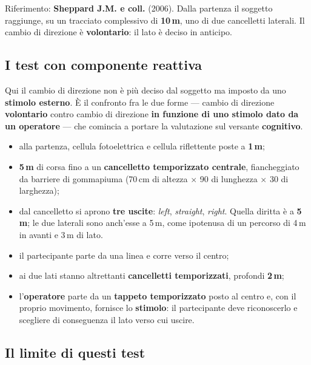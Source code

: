 Riferimento: \textbf{Sheppard J.M. e coll.} (2006). Dalla partenza il soggetto raggiunge, su un
tracciato complessivo di \textbf{10\,m}, uno di due cancelletti laterali. Il cambio di direzione è
\textbf{volontario}: il lato è deciso in anticipo.

\subsection{I test con componente reattiva}

Qui il cambio di direzione non è più deciso dal soggetto ma imposto da uno \textbf{stimolo
esterno}. È il confronto fra le due forme --- cambio di direzione \textbf{volontario} contro cambio
di direzione \textbf{in funzione di uno stimolo dato da un operatore} --- che comincia a portare la
valutazione sul versante \textbf{cognitivo}.

\begin{itemize}
  \item alla partenza, cellula fotoelettrica e cellula riflettente poste a \textbf{1\,m};
  \item \textbf{5\,m} di corsa fino a un \textbf{cancelletto temporizzato centrale}, fiancheggiato
    da barriere di gommapiuma (70\,cm di altezza $\times$ 90 di lunghezza $\times$ 30 di
    larghezza);
  \item dal cancelletto si aprono \textbf{tre uscite}: \textit{left}, \textit{straight},
    \textit{right}. Quella diritta è a \textbf{5\,m}; le due laterali sono anch'esse a 5\,m, come
    ipotenusa di un percorso di 4\,m in avanti e 3\,m di lato.
\end{itemize}

\begin{itemize}
  \item il partecipante parte da una linea e corre verso il centro;
  \item ai due lati stanno altrettanti \textbf{cancelletti temporizzati}, profondi \textbf{2\,m};
  \item l'\textbf{operatore} parte da un \textbf{tappeto temporizzato} posto al centro e, con il
    proprio movimento, fornisce lo \textbf{stimolo}: il partecipante deve riconoscerlo e scegliere
    di conseguenza il lato verso cui uscire.
\end{itemize}

\subsection{Il limite di questi test}


